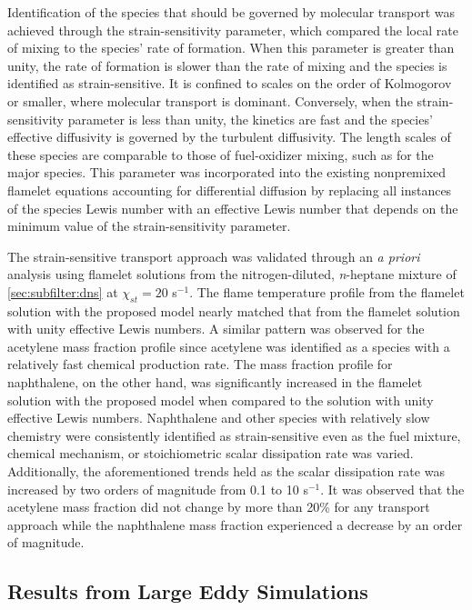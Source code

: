 Identification of the species that should be governed by molecular transport was achieved through the strain-sensitivity parameter, which compared the local rate of mixing to the species' rate of formation. When this parameter is greater than unity, the rate of formation is slower than the rate of mixing and the species is identified as strain-sensitive. It is confined to scales on the order of Kolmogorov or smaller, where molecular transport is dominant. Conversely, when the strain-sensitivity parameter is less than unity, the kinetics are fast and the species' effective diffusivity is governed by the turbulent diffusivity. The length scales of these species are comparable to those of fuel-oxidizer mixing, such as for the major species. This parameter was incorporated into the existing nonpremixed flamelet equations accounting for differential diffusion by replacing all instances of the species Lewis number with an effective Lewis number that depends on the minimum value of the strain-sensitivity parameter.

The strain-sensitive transport approach was validated through an \textit{a priori} analysis using flamelet solutions from the nitrogen-diluted, \textit{n}-heptane mixture of \cref{sec:subfilter:dns} at $\chi_{st} = 20$ s$^{-1}$. The flame temperature profile from the flamelet solution with the proposed model nearly matched that from the flamelet solution with unity effective Lewis numbers. A similar pattern was observed for the acetylene mass fraction profile since acetylene was identified as a species with a relatively fast chemical production rate. The mass fraction profile for naphthalene, on the other hand, was significantly increased in the flamelet solution with the proposed model when compared to the solution with unity effective Lewis numbers. Naphthalene and other species with relatively slow chemistry were consistently identified as strain-sensitive even as the fuel mixture, chemical mechanism, or stoichiometric scalar dissipation rate was varied. Additionally, the aforementioned trends held as the scalar dissipation rate was increased by two orders of magnitude from 0.1 to 10 s$^{-1}$. It was observed that the acetylene mass fraction did not change by more than 20\% for any transport approach while the naphthalene mass fraction experienced a decrease by an order of magnitude.

\subsection{Results from Large Eddy Simulations}
\label{sec:conclusion:contributions:les}

